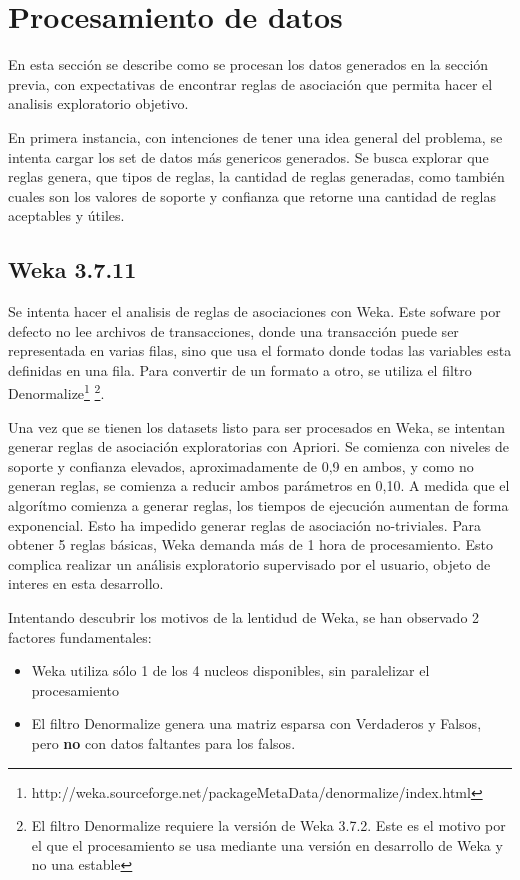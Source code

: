 \documentclass[journal]{IEEEtran}
\begin{document}
\section{Procesamiento de datos}
En esta sección se describe como se procesan los datos generados en la sección
previa, con expectativas de encontrar reglas de asociación que permita hacer el
analisis exploratorio objetivo.

En primera instancia, con intenciones de tener una idea general del problema,
se intenta cargar los set de datos más genericos generados. Se busca explorar
que reglas genera, que tipos de reglas, la cantidad de reglas generadas, como
también cuales son los valores de soporte y confianza que retorne una cantidad
de reglas aceptables y útiles. 

\subsection{Weka 3.7.11}
Se intenta hacer el analisis de reglas de asociaciones con Weka. Este sofware por defecto
no lee archivos de transacciones, donde una transacción puede ser representada en varias filas,
 sino que usa el formato donde todas las variables esta definidas en una fila. Para convertir
de un formato a otro, se utiliza el filtro 
Denormalize\footnote{http://weka.sourceforge.net/packageMetaData/denormalize/index.html}
\footnote{El filtro Denormalize requiere la versión de Weka 3.7.2. Este es el motivo por el que 
el procesamiento se usa mediante una versión en desarrollo de Weka y no una estable}. 

Una vez que se tienen los datasets listo para ser procesados en Weka, se intentan generar reglas
de asociación exploratorias con Apriori. Se comienza con niveles de soporte y confianza elevados,
aproximadamente de 0,9 en ambos, y como no generan reglas, se comienza a reducir ambos parámetros
en 0,10. A medida que el algorítmo comienza a generar reglas, los tiempos de ejecución aumentan
de forma exponencial. Esto ha impedido generar reglas de asociación no-triviales. Para obtener
5 reglas básicas, Weka demanda más de 1 hora de procesamiento. Esto complica realizar un análisis
exploratorio supervisado por el usuario, objeto de interes en esta desarrollo.

Intentando descubrir los motivos de la lentidud de Weka, se han observado 2 factores fundamentales:
\begin{itemize}
	\item Weka utiliza sólo 1 de los 4 nucleos disponibles, sin paralelizar el procesamiento
	\item El filtro Denormalize genera una matriz esparsa con Verdaderos y Falsos, pero \textbf{no} con
	datos faltantes para los falsos. 
\end{itemize}
\end{document}
